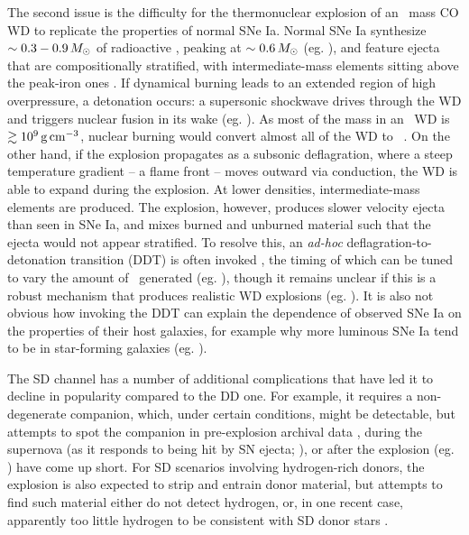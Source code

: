  
The second issue is the difficulty for the thermonuclear explosion of an \Mch\ mass CO WD to replicate the properties of normal SNe Ia.  Normal SNe Ia synthesize $\sim0.3 - 0.9\,\Msun$ of radioactive \Ni, peaking at $\sim0.6\,\Msun$ (eg. \citealt{stri+06, pirotk14}), and feature ejecta that are compositionally stratified, with intermediate-mass elements sitting above the peak-iron ones \citep{howe11, hill+13}.  If dynamical burning leads to an extended region of high overpressure, a detonation occurs: a supersonic shockwave drives through the WD and triggers nuclear fusion in its wake (eg. \citealt{seit+09}).  As most of the mass in an \Mch\ WD is $\gtrsim10^9\,\gcc$, nuclear burning would convert almost all of the WD to \Ni\ \citep{howe11, hill+13}.  On the other hand, if the explosion propagates as a subsonic deflagration, where a steep temperature gradient -- a flame front -- moves outward via conduction, the WD is able to expand during the explosion.  At lower densities, intermediate-mass elements are produced.  The explosion, however, produces slower velocity ejecta than seen in SNe Ia, and mixes burned and unburned material such that the ejecta would not appear stratified.  To resolve this, an \textit{ad-hoc} deflagration-to-detonation transition (DDT) is often invoked \citep{khok91}, the timing of which can be tuned to vary the amount of \Ni\ generated (eg. \citealt{hill+13}), though it remains unclear if this is a robust mechanism that produces realistic WD explosions (eg. \citealt{fishj15}).  It is also not obvious how invoking the DDT can explain the dependence of observed SNe Ia on the properties of their host galaxies, for example why more luminous SNe Ia tend to be in star-forming galaxies (eg. \citealt{hamu+00, sull+10}).

The SD channel has a number of additional complications \citep{maozmn14, tsebs15} that have led it to decline in popularity compared to the DD one.  For example, it requires a non-degenerate companion, which, under certain conditions, might be detectable, but attempts to spot the companion in pre-explosion archival data \citep{li+11cpn, nielvn13, niel+14}, during the supernova (as it responds to being hit by SN ejecta; \citealt{bloo+12,ollms15}), or after the explosion (eg. \citealt{kerz+14rem}) have come up short.  For SD scenarios involving hydrogen-rich donors, the explosion is also expected to strip and entrain donor material, but attempts to find such material either do not detect hydrogen, or, in one recent case, apparently too little hydrogen to be consistent with SD donor stars \citep{magu+16}.  

